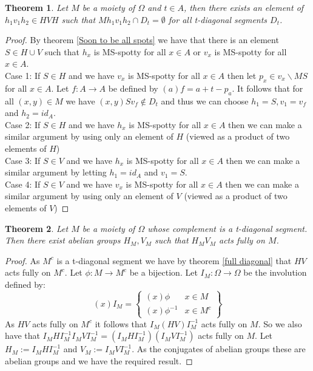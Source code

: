 \documentclass{report}
\newtheorem{theorem}{Theorem}[section]
\begin{document}
\begin{theorem} \label{miss moiety}
Let \(M\) be a moiety of \(\Omega\) and \(t\in A\), then there exists an element of \(h_1v_1h_2\in HVH\) such that \(Mh_1v_1h_2 \cap D_t= \emptyset\) for all t-diagonal segments \(D_t\).
\end{theorem}
\begin{proof}
By theorem \ref{Soon to be all spots} we have that there is an element \(S\in H\cup V\) such that \(h_x\) is MS-spotty for all \(x\in A\) or \(v_x\) is MS-spotty for all \(x\in A\).\\
Case 1: If \(S \in H\) and we have \(v_x\) is MS-spotty for all \(x\in A\) then let \(p_x\in v_x \backslash MS\) for all \(x\in A\). Let \(f:A\rightarrow A\) be defined by \((a)f=a+t-p_a\). It follows that for all \((x,y)\in M\) we have \((x,y)Sv_f\notin D_t\) and thus we can choose \(h_1=S,v_1=v_f\) and \(h_2=id_A\).\\
Case 2: If \(S \in H\) and we have \(h_x\) is MS-spotty for all \(x\in A\) then we can make a similar argument by using only an element of \(H\) (viewed as a product of two elements of \(H\))\\
Case 3: If \(S \in V\) and we have \(h_x\) is MS-spotty for all \(x\in A\) then we can make a similar argument by letting \(h_1=id_A\) and \(v_1=S\).\\
Case 4: If \(S \in V\) and we have \(v_x\) is MS-spotty for all \(x\in A\) then we can make a similar argument by using only an element of \(V\) (viewed as a product of two elements of \(V\))
\end{proof}
\begin{theorem}\label{full diagonal complement}
Let \(M\) be a moiety of \(\Omega\) whose complement is a t-diagonal segment. Then there exist abelian groups \(H_M,V_M\) such that \(H_MV_M\) acts fully on \(M\).
\end{theorem}
\begin{proof}
As \(M^c\) is a t-diagonal segment we have by theorem \ref{full diagonal} that \(HV\) acts fully on \(M^c\). Let \(\phi:M\rightarrow M^c\) be a bijection. Let \(I_M:\Omega \rightarrow \Omega\) be the involution defined by:
\[(x)I_M=\left\{\begin{array}{lr}
(x)\phi & x\in M\\
(x)\phi^{-1} & x \in M^c 
\end{array}\right\}\]
As \(HV\) acts fully on \(M^c\) it follows that \(I_M(HV)I_M^{-1}\) acts fully on \(M\). So we also have that \(I_MHI_M^{-1}I_MVI_M^{-1}=(I_MHI_M^{-1})(I_MVI_M^{-1})\) acts fully on \(M\). Let \(H_M:=I_MHI_M^{-1}\) and \(V_M:=I_MVI_M^{-1}\). As the conjugates of abelian groups these are abelian groups and we have the required result.
\end{proof}
\end{document}
